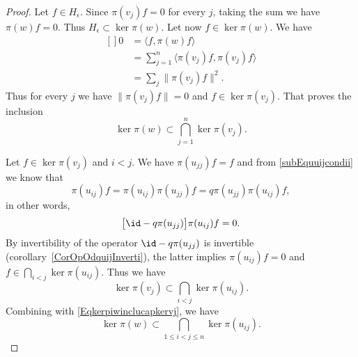 \begin{proof}
    Let $f\in H_{\epsilon}$. Since $\pi(v_j)f=0$ for every $j$, taking the sum we have $\pi(w)f=0$. Thus \( H_{\epsilon}\subset\ker\pi(w)\). Let now $f\in\ker\pi(w)$. We have
    \begin{equation}
        \begin{aligned}[]
            0&=\langle f, \pi(w)f\rangle \\
            &=\sum_{j=1}^n\langle \pi(v_j)f, \pi(v_j)f\rangle \\
            &=\sum_j\| \pi(v_j)f \|^2.
        \end{aligned}
    \end{equation}
    Thus for every $j$ we have $\| \pi(v_j)f \|=0$ and $f\in\ker\pi(v_j)$. That proves the inclusion
    \begin{equation}        \label{Eqkerpiwinclucapkervj}
        \ker\pi(w)\subset\bigcap_{j=1}^n\ker\pi(v_j).
    \end{equation}

    Let $f\in\ker\pi(v_j)$ and \( i<j\). We have $\pi(u_{jj})f=f$ and from \eqref{subEquuijcondii} we know that
    \begin{equation}
        \pi(u_{ij})f=\pi(u_{ij})\pi(u_{jj})f=q\pi(u_{jj})\pi(u_{ij})f,
    \end{equation}
    in other words,
    \begin{equation}
        \big[ \id-q\pi(u_{jj}) \big]\pi(u_{ij})f=0.
    \end{equation}
    By invertibility of the operator $\id-q\pi(u_{jj})$ is invertible (corollary~\ref{CorOpOdquijInverti}), the latter implies $\pi(u_{ij})f=0$ and $f\in\bigcap_{i<j}\ker\pi(u_{ij})$. Thus we have
    \begin{equation}        \label{Eqketpivjsubipyjketpiuij}
        \ker\pi(v_j)\subset\bigcap_{i<j}\ker\pi(u_{ij}).
    \end{equation}
    Combining with \eqref{Eqkerpiwinclucapkervj}, we have
    \begin{equation}        \label{EqIntSubSintkerkera}
        \ker\pi(w)\subset\bigcap_{1\leq i<j\leq n}\ker\pi(u_{ij}).
    \end{equation}


\end{proof}
